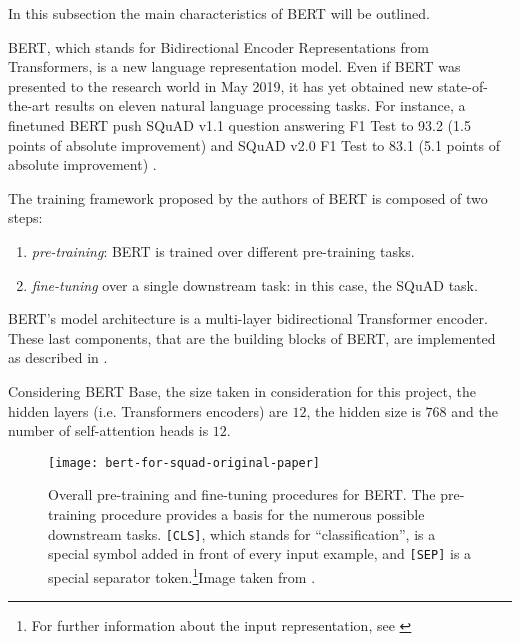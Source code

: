In this subsection the main characteristics of BERT will be outlined.

BERT, which stands for Bidirectional Encoder Representations from Transformers, is a new language representation model. Even if BERT was presented to the research world in May 2019, it has yet obtained new state-of-the-art results on eleven natural language processing tasks. For instance, a finetuned BERT push SQuAD v1.1 question answering F1 Test to 93.2 (1.5 points of absolute improvement) and SQuAD v2.0 F1 Test to 83.1 (5.1 points of absolute improvement) \cite{bert}.

The training framework proposed by the authors of BERT is composed of two steps:
\begin{enumerate}
  \item \textit{pre-training}: BERT is trained over different pre-training tasks.
  \item \textit{fine-tuning} over a single downstream task: in this case, the SQuAD task.
\end{enumerate}

BERT’s  model  architecture is a multi-layer bidirectional Transformer encoder. These last components, that are the building blocks of BERT, are implemented as described in \cite{attentionisallyouneed}.

Considering BERT Base, the size taken in consideration for this project, the hidden layers (i.e. Transformers encoders) are $12$, the hidden size is $768$ and the number of self-attention heads is $12$.

\begin{figure}[t]
\centering
\texttt{[image: bert-for-squad-original-paper]}
\caption{Overall pre-training and fine-tuning procedures for BERT. The pre-training procedure provides a basis for the numerous possible downstream tasks. \texttt{[CLS]}, which stands for ``classification'', is a special symbol added in front of every input example, and \texttt{[SEP]} is a special separator token.\footnote{For further information about the input representation, see \cite{bert}}Image taken from \cite{bert}.}
\medskip
\label{fig:bertsquad}
\end{figure}

